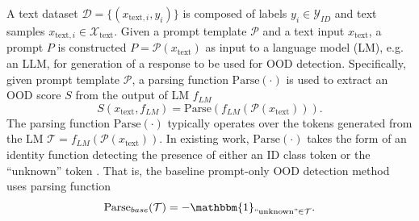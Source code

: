 A text dataset $\mathcal{D} = \{(x_{\text{text},i}, y_i)\}$ is composed of labels $y_i \in \mathcal{Y}_{ID}$ and text samples $x_{\text{text},i} \in \mathcal{X}_{\text{text}}$. Given a prompt template $\mathcal{P}$ and a text input $x_{\text{text}}$, a prompt $P$ is constructed $P = \mathcal{P}(x_{\text{text}})$ as input to a language model (LM), e.g. an LLM, for generation of a response to be used for OOD detection. Specifically, given prompt template $\mathcal{P}$, a parsing function $\text{Parse}(\cdot)$ is used to extract an OOD score $S$ from the output of LM $f_{LM}$
\begin{equation}
	S(x_{\text{text}},f_{LM}) = \text{Parse}(f_{LM}(\mathcal{P}(x_{\text{text}}))).
\end{equation}
The parsing function $\text{Parse}(\cdot)$ typically operates over the tokens generated from the LM $\mathcal{T} = f_{LM}(\mathcal{P}(x_{\text{text}}))$. In existing work, $\text{Parse}(\cdot)$ takes the form of an identity function detecting the presence of either an ID class token or the ``unknown'' token \cite{wang2024beyond}. That is, the baseline prompt-only OOD detection method uses parsing function
\begin{equation}
    \text{Parse}_{base}(\mathcal{T}) = -\mathbbm{1}_{\text{``unknown''} \in \mathcal{T}}.
\end{equation}

